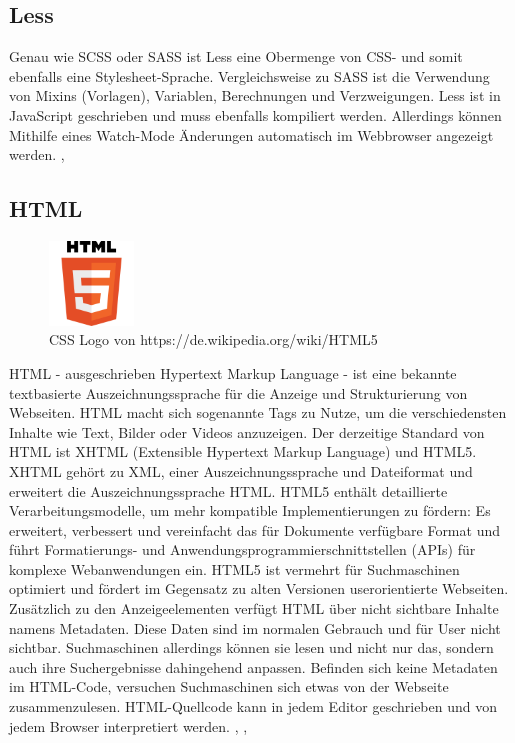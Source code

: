 \subsection{Less}
Genau wie SCSS oder SASS ist Less eine Obermenge von CSS- und somit ebenfalls eine Stylesheet-Sprache.
Vergleichsweise zu SASS ist die Verwendung von Mixins (Vorlagen), Variablen, Berechnungen und Verzweigungen.
Less ist in JavaScript geschrieben und muss ebenfalls kompiliert werden. Allerdings können 
Mithilfe eines Watch-Mode Änderungen automatisch im Webbrowser angezeigt werden. \cite{noauthor_sass_nodate-1}, \cite{noauthor_less_nodate}

\subsection{HTML}
\begin{figure}
  \begin{center}
    \includegraphics[width=0.2\textwidth]{pics/HTML_Logo.png}
    \caption{CSS Logo von https://de.wikipedia.org/wiki/HTML5}
  \end{center}
\end{figure} 
HTML - ausgeschrieben Hypertext Markup Language - ist eine bekannte textbasierte Auszeichnungssprache für die 
Anzeige und Strukturierung von Webseiten. HTML macht sich sogenannte Tags zu Nutze, um die verschiedensten
Inhalte wie Text, Bilder oder Videos anzuzeigen. Der derzeitige Standard von HTML ist XHTML (Extensible Hypertext Markup Language) und HTML5.
XHTML gehört zu XML, einer Auszeichnungssprache und Dateiformat und erweitert die Auszeichnungssprache HTML.
\newline
HTML5 enthält detaillierte Verarbeitungsmodelle, um mehr kompatible Implementierungen zu fördern: 
Es erweitert, verbessert und vereinfacht das für Dokumente verfügbare Format und führt 
Formatierungs- und Anwendungsprogrammierschnittstellen (APIs) für komplexe Webanwendungen ein. HTML5 ist 
vermehrt für Suchmaschinen optimiert und fördert im Gegensatz zu alten Versionen userorientierte Webseiten.
Zusätzlich zu den Anzeigeelementen verfügt HTML über nicht sichtbare Inhalte namens Metadaten. Diese Daten sind im normalen 
Gebrauch und für User nicht sichtbar. Suchmaschinen allerdings können sie lesen und nicht nur das, sondern auch ihre Suchergebnisse dahingehend
anpassen. Befinden sich keine Metadaten im HTML-Code, versuchen Suchmaschinen sich etwas von der Webseite zusammenzulesen.
HTML-Quellcode kann in jedem Editor geschrieben und von jedem Browser interpretiert werden. \cite{noauthor_hypertext_2022}, \cite{noauthor_html_nodate}, \cite{noauthor_html_nodate-1}

